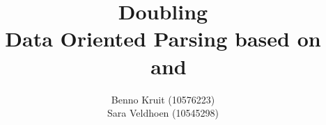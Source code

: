 \documentclass{article}
\title{Doubling \dops \\ 
{\normalsize Data Oriented Parsing based on \ddop~and \dops}}
\author{Benno Kruit (10576223)\\
Sara Veldhoen (10545298)}
\begin{document}
\newcommand{\dops}[0]{DOP$ ^*$}
\newcommand{\ddop}[0]{Double-DOP}


\maketitle










\end{document}
